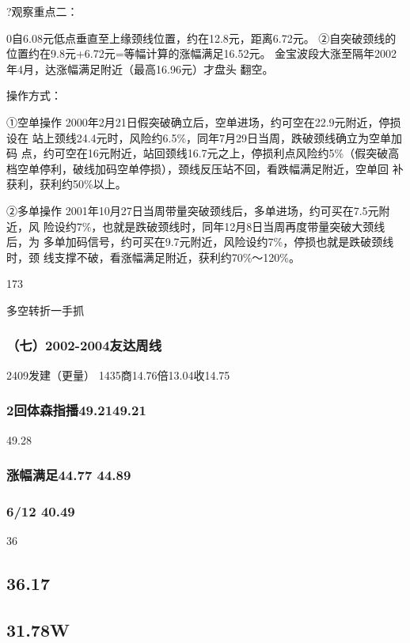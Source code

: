 \documentclass{article}
\begin{document}
?观察重点二：

0自6.08元低点垂直至上缘颈线位置，约在12.8元，距离6.72元。 ②自突破颈线的位置约在9.8元+6.72元=等幅计算的涨幅满足16.52元。 金宝波段大涨至隔年2002年4月，达涨幅满足附近（最高16.96元）才盘头 翻空。

操作方式：

①空单操作 2000年2月21日假突破确立后，空单进场，约可空在22.9元附近，停损设在 站上颈线24.4元时，风险约6.5\%，同年7月29日当周，跌破颈线确立为空单加码 点，约可空在16元附近，站回颈线16.7元之上，停损利点风险约5\%（假突破高 档空单停利，破线加码空单停损），颈线反压站不回，看跌幅满足附近，空单回 补获利，获利约50\%以上。

②多单操作 2001年10月27日当周带量突破颈线后，多单进场，约可买在7.5元附近，风 险设约7\%，也就是跌破颈线时，同年12月8日当周再度带量突破大颈线后，为 多单加码信号，约可买在9.7元附近，风险设约7\%，停损也就是跌破颈线时，颈 线支撑不破，看涨幅满足附近，获利约70\%～120\%。

173

\clearpage

多空转折一手抓

\subsubsection{（七）2002-2004友达周线}

2409发建（更量） 1435商14.76倍13.04收14.75

\subsubsection{2回体森指播49.2149.21}

49.28

\subsubsection{涨幅满足44.77 44.89}

\subsubsection{6/12 40.49}

36

\subsection{36.17}

\subsection{31.78W}
\end{document}
